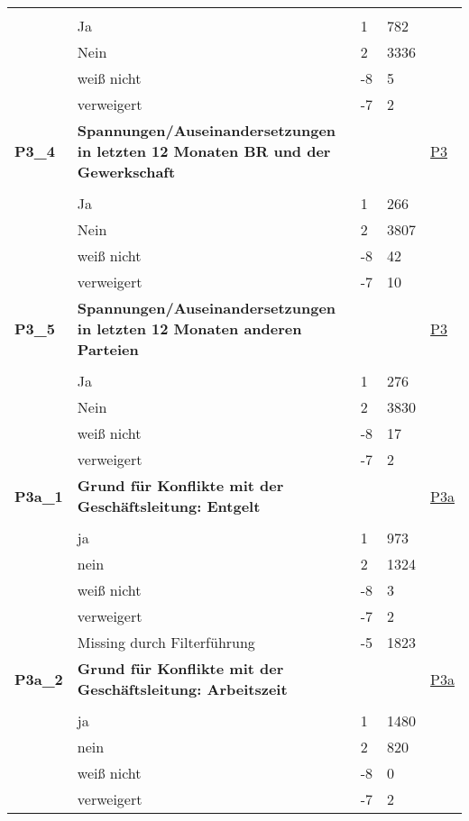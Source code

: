 \begin{longtable}{| L{2.5cm} | L{8.25cm}| C{1.5cm} | R{1.25cm} | C{2.25cm} |  }
   &  &  &  &  \\ 
   & Ja & 1 & 782 &  \\ 
   & Nein & 2 & 3336 &  \\ 
   & weiß nicht & -8 & 5 &  \\ 
   & verweigert & -7 & 2 &  \\ 
   \midrule
\textbf{P3\_4}\label{var:suf:P3:4} & \textbf{Spannungen/Auseinandersetzungen in letzten 12 Monaten BR und der Gewerkschaft} &  &  & \hyperref[P3]{P3} \\ 
   &  &  &  &  \\ 
   & Ja & 1 & 266 &  \\ 
   & Nein & 2 & 3807 &  \\ 
   & weiß nicht & -8 & 42 &  \\ 
   & verweigert & -7 & 10 &  \\ 
   \midrule
\textbf{P3\_5}\label{var:suf:P3:5} & \textbf{Spannungen/Auseinandersetzungen in letzten 12 Monaten anderen Parteien} &  &  & \hyperref[P3]{P3} \\ 
   &  &  &  &  \\ 
   & Ja & 1 & 276 &  \\ 
   & Nein & 2 & 3830 &  \\ 
   & weiß nicht & -8 & 17 &  \\ 
   & verweigert & -7 & 2 &  \\ 
   \midrule
\textbf{P3a\_1}\label{var:suf:P3a:1} & \textbf{Grund für Konflikte mit der Geschäftsleitung: Entgelt} &  &  & \hyperref[P3a]{P3a} \\ 
   &  &  &  &  \\ 
   & ja & 1 & 973 &  \\ 
   & nein & 2 & 1324 &  \\ 
   & weiß nicht & -8 & 3 &  \\ 
   & verweigert & -7 & 2 &  \\ 
   & Missing durch Filterführung & -5 & 1823 &  \\ 
   \midrule
\textbf{P3a\_2}\label{var:suf:P3a:2} & \textbf{Grund für Konflikte mit der Geschäftsleitung: Arbeitszeit} &  &  & \hyperref[P3a]{P3a} \\ 
   &  &  &  &  \\ 
   & ja & 1 & 1480 &  \\ 
   & nein & 2 & 820 &  \\ 
   & weiß nicht & -8 & 0 &  \\ 
   & verweigert & -7 & 2 &  \\ 

\end{longtable}
